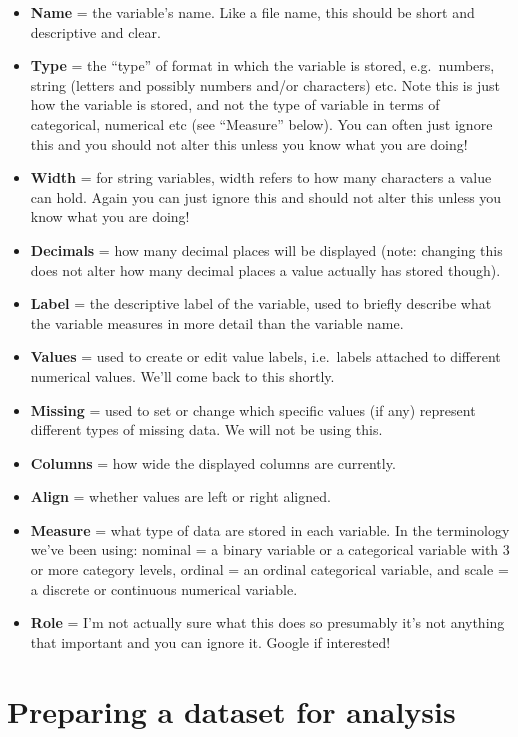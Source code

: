 \documentclass[
]{book}
\begin{document}
\begin{itemize}
\item
  \textbf{Name} = the variable's name. Like a file name, this should be short and descriptive and clear.
\item
  \textbf{Type} = the ``type'' of format in which the variable is stored, e.g.~numbers, string (letters and possibly numbers and/or characters) etc. Note this is just how the variable is stored, and not the type of variable in terms of categorical, numerical etc (see ``Measure'' below). You can often just ignore this and you should not alter this unless you know what you are doing!
\item
  \textbf{Width} = for string variables, width refers to how many characters a value can hold. Again you can just ignore this and should not alter this unless you know what you are doing!
\item
  \textbf{Decimals} = how many decimal places will be displayed (note: changing this does not alter how many decimal places a value actually has stored though).
\item
  \textbf{Label} = the descriptive label of the variable, used to briefly describe what the variable measures in more detail than the variable name.
\item
  \textbf{Values} = used to create or edit value labels, i.e.~labels attached to different numerical values. We'll come back to this shortly.
\item
  \textbf{Missing} = used to set or change which specific values (if any) represent different types of missing data. We will not be using this.
\item
  \textbf{Columns} = how wide the displayed columns are currently.
\item
  \textbf{Align} = whether values are left or right aligned.
\item
  \textbf{Measure} = what type of data are stored in each variable. In the terminology we've been using: nominal = a binary variable or a categorical variable with 3 or more category levels, ordinal = an ordinal categorical variable, and scale = a discrete or continuous numerical variable.
\item
  \textbf{Role} = I'm not actually sure what this does so presumably it's not anything that important and you can ignore it. Google if interested!
\end{itemize}

\hypertarget{preparing-a-dataset-for-analysis}{%
\chapter{Preparing a dataset for analysis}\label{preparing-a-dataset-for-analysis}}
\end{document}
